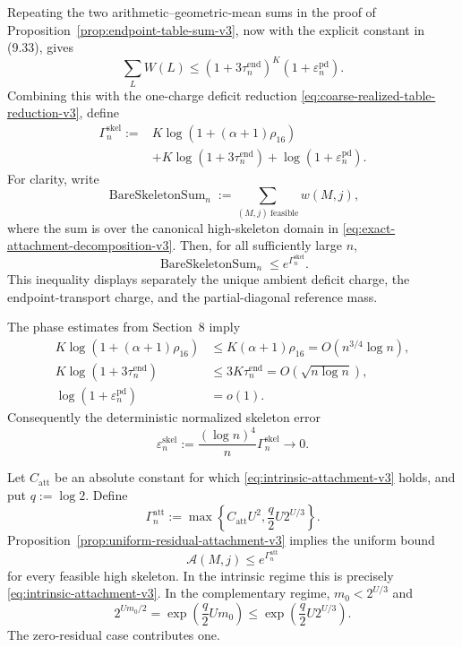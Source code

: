 Repeating the two arithmetic--geometric-mean sums in the proof of
Proposition~\ref{prop:endpoint-table-sum-v3}, now with the explicit constant in
(9.33), gives
\begin{equation*}
  \sum_LW(L)
  \le
  (1+3\tau_n^{\mathrm{end}})^K
  (1+\varepsilon_n^{\mathrm{pd}}).
  \tag{9.34}
\end{equation*}
Combining this with the one-charge deficit reduction
\eqref{eq:coarse-realized-table-reduction-v3}, define
\begin{equation*}
\begin{split}
  \Gamma_n^{\mathrm{skel}}
  :={}&
  K\log\!\left(1+(\alpha+1)\rho_{16}\right)\\
  &+K\log\!\left(1+3\tau_n^{\mathrm{end}}\right)
  +\log\!\left(1+\varepsilon_n^{\mathrm{pd}}\right).
\end{split}
  \tag{9.35}
\end{equation*}
For clarity, write
\[
  \operatorname{BareSkeletonSum}_n
  :=
  \sum_{(M,j)\ \mathrm{feasible}} w(M,j),
\]
where the sum is over the canonical high-skeleton domain in
\eqref{eq:exact-attachment-decomposition-v3}. Then, for all sufficiently large
$n$,
\begin{equation*}
  \operatorname{BareSkeletonSum}_n
  \le e^{\Gamma_n^{\mathrm{skel}}}.
  \tag{9.36}
\end{equation*}
This inequality displays separately the unique ambient deficit charge, the
endpoint-transport charge, and the partial-diagonal reference mass.

The phase estimates from Section~8 imply
\[
\begin{split}
  K\log\!\left(1+(\alpha+1)\rho_{16}\right)
  &\le K(\alpha+1)\rho_{16}
    =O(n^{3/4}\log n),\\
  K\log\!\left(1+3\tau_n^{\mathrm{end}}\right)
  &\le3K\tau_n^{\mathrm{end}}
    =O(\sqrt{n\log n}),\\
  \log(1+\varepsilon_n^{\mathrm{pd}})&=o(1).
\end{split}
\]
Consequently the deterministic normalized skeleton error
\begin{equation*}
  \varepsilon_n^{\mathrm{skel}}
  :=
  \frac{(\log n)^4}{n}\Gamma_n^{\mathrm{skel}}
  \longrightarrow0.
  \tag{9.37}
\end{equation*}

Let $C_{\mathrm{att}}$ be an absolute constant for which
\eqref{eq:intrinsic-attachment-v3} holds, and put $q:=\log 2$. Define
\begin{equation*}
  \Gamma_n^{\mathrm{att}}
  :=
  \max\!\left\{
    C_{\mathrm{att}}U^2,
    \frac q2U2^{U/3}
  \right\}.
  \tag{9.38}
\end{equation*}
Proposition~\ref{prop:uniform-residual-attachment-v3} implies the uniform
bound
\begin{equation*}
  \mathcal A(M,j)\le e^{\Gamma_n^{\mathrm{att}}}
  \tag{9.39}
\end{equation*}
for every feasible high skeleton. In the intrinsic regime this is precisely
\eqref{eq:intrinsic-attachment-v3}. In the complementary regime,
$m_0<2^{U/3}$ and
\[
  2^{Um_0/2}
  =\exp\!\left(\frac q2Um_0\right)
  \le\exp\!\left(\frac q2U2^{U/3}\right).
\]
The zero-residual case contributes one.


